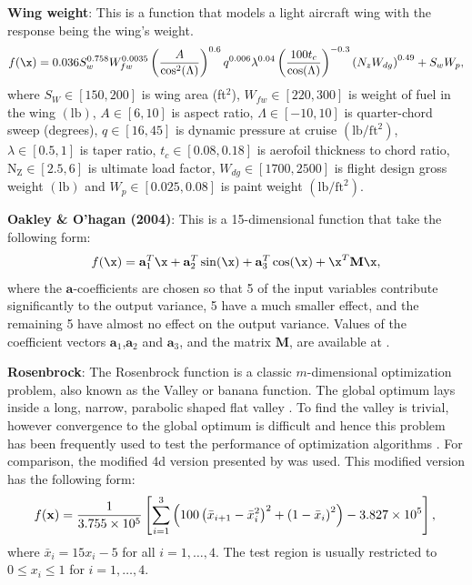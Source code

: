 \documentclass [PhD] {package/uclathes}
\begin{document}
\textbf{Wing weight}: This is a function that models a light aircraft wing with the response being the wing's weight.
\begin{equation*}
f(\x)=0.036 S_w^{0.758} W_{f w}^{0.0035}\left(\frac{A}{\cos ^2(\Lambda)}\right)^{0.6} q^{0.006} \lambda^{0.04}\left(\frac{100 t_c}{\cos (\Lambda)}\right)^{-0.3}\left(N_z W_{d g}\right)^{0.49}+S_w W_p,
\end{equation*}
where $S_W \in[150,200]$ is wing area (ft$^2$), $W_{f w} \in[220,300]$ is weight of fuel in the wing $(\mathrm{lb})$, $A \in[6,10]$ is aspect ratio, $\Lambda \in[-10,10]$ is quarter-chord sweep (degrees), $q \in[16,45]$ is dynamic pressure at cruise $\left(\mathrm{lb} / \mathrm{ft}^2\right)$, $\lambda \in[0.5,1]$ is taper ratio, $t_c \in[0.08,0.18]$ is aerofoil thickness to chord ratio, $\mathrm{N}_{\mathrm{Z}} \in[2.5,6]$ is ultimate load factor, $W_{d g} \in[1700,2500]$ is flight design gross weight $(\mathrm{lb})$ and $W_p \in[0.025,0.08]$ is paint weight $\left(\mathrm{lb} / \mathrm{ft}^2\right)$.


\textbf{Oakley \& O'hagan (2004)}: This is a 15-dimensional function that take the following form:
\begin{equation*}
f(\x)=\mathbf{a}_1^T \x+\mathbf{a}_2^T \sin (\x)+\mathbf{a}_3^T \cos (\x)+\x^T \mathbf{M} \x,
\end{equation*}
where the $\mathbf{a}$-coefficients are chosen so that 5 of the input variables contribute significantly to the output variance, 5 have a much smaller effect, and the remaining 5 have almost no effect on the output variance. Values of the coefficient vectors $\mathbf{a}_1$,$\mathbf{a}_2$ and $\mathbf{a}_3$, and the matrix $\mathbf{M}$, are available at \textcite{simulationlib}.


\textbf{Rosenbrock}: %
The Rosenbrock function is a classic $m$-dimensional optimization problem, also known as the Valley or banana function. The global optimum lays inside a long, narrow, parabolic shaped flat valley \parencite{molga2005test}. To find the valley is trivial, however convergence to the global optimum is difficult and hence this problem has been frequently used to test the performance of optimization algorithms \parencite{picheny2013benchmark}. For comparison, the modified 4d version presented by \textcite{picheny2013benchmark} was used. This modified version has the following form:
\begin{equation}
f(\mathbf{x})=\frac{1}{3.755 \times 10^5}\left[\sum_{i=1}^3\left(100\left(\bar{x}_{i+1}-\bar{x}_i^2\right)^2+\left(1-\bar{x}_i\right)^2\right)-3.827 \times 10^5\right], \\
\end{equation}
where $\bar{x}_i=15 x_i-5$ for all $i=1,\ldots,4$.
The test region is usually restricted to  $0 \leq x_i \leq 1$ for $i=1, \ldots, 4$. %
\end{document}
